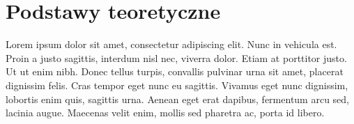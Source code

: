 \section{Podstawy teoretyczne}
Lorem ipsum dolor sit amet, consectetur adipiscing elit. Nunc in vehicula est. Proin a justo sagittis, interdum nisl nec, viverra dolor. Etiam at porttitor justo. Ut ut enim nibh. Donec tellus turpis, convallis pulvinar urna sit amet, placerat dignissim felis. Cras tempor eget nunc eu sagittis. Vivamus eget nunc dignissim, lobortis enim quis, sagittis urna. Aenean eget erat dapibus, fermentum arcu sed, lacinia augue. Maecenas velit enim, mollis sed pharetra ac, porta id libero.
